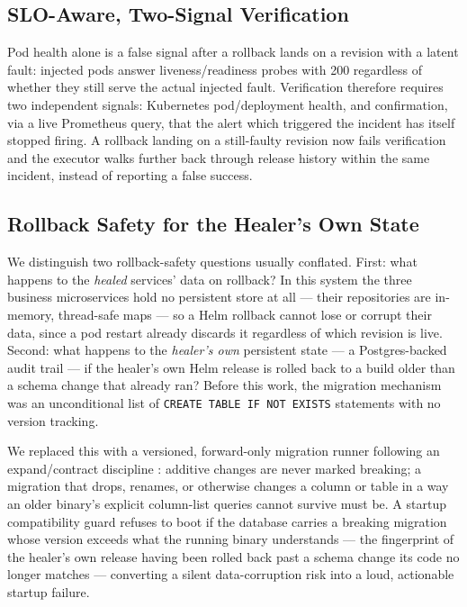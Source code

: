 \documentclass[conference]{IEEEtran}
\begin{document}
\subsection{SLO-Aware, Two-Signal Verification}
\label{sec:verification}
Pod health alone is a false signal after a rollback lands on a revision with a latent fault: injected pods answer liveness/readiness probes with 200 regardless of whether they still serve the actual injected fault. Verification therefore requires two independent signals: Kubernetes pod/deployment health, and confirmation, via a live Prometheus query, that the alert which triggered the incident has itself stopped firing. A rollback landing on a still-faulty revision now fails verification and the executor walks further back through release history within the same incident, instead of reporting a false success.

\subsection{Rollback Safety for the Healer's Own State}
We distinguish two rollback-safety questions usually conflated. First: what happens to the \emph{healed} services' data on rollback? In this system the three business microservices hold no persistent store at all --- their repositories are in-memory, thread-safe maps --- so a Helm rollback cannot lose or corrupt their data, since a pod restart already discards it regardless of which revision is live. Second: what happens to the \emph{healer's own} persistent state --- a Postgres-backed audit trail --- if the healer's own Helm release is rolled back to a build older than a schema change that already ran? Before this work, the migration mechanism was an unconditional list of \texttt{CREATE TABLE IF NOT EXISTS} statements with no version tracking.

We replaced this with a versioned, forward-only migration runner following an expand/contract discipline \cite{sadalage2006refactoring}: additive changes are never marked breaking; a migration that drops, renames, or otherwise changes a column or table in a way an older binary's explicit column-list queries cannot survive must be. A startup compatibility guard refuses to boot if the database carries a breaking migration whose version exceeds what the running binary understands --- the fingerprint of the healer's own release having been rolled back past a schema change its code no longer matches --- converting a silent data-corruption risk into a loud, actionable startup failure.
\end{document}
